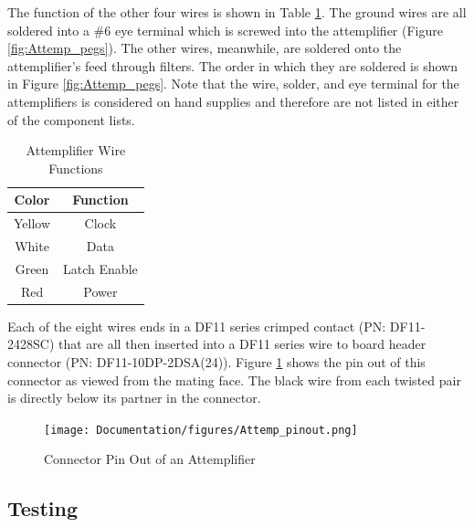 \documentclass[12pt,a4paper,oneside]{article}
\begin{document}
The function of the other four wires is shown in Table \ref{table: Wire_func}. The ground wires are all soldered into a \#6 eye terminal which is screwed into the attemplifier (Figure \ref{fig:Attemp_pegs}). The other wires, meanwhile, are  soldered onto the attemplifier's feed through filters. The order in which they are soldered is shown in Figure \ref{fig:Attemp_pegs}. Note that the wire, solder, and eye terminal for the attemplifiers is considered on hand supplies and therefore are not listed in either of the component lists. 

\begin{table}[H]
\centering
\caption{Attemplifier Wire Functions}
\begin{tabular}{@{}cc@{}}
\toprule
Color & Function\\ 
\midrule
Yellow & Clock\\
White & Data\\
Green & Latch Enable\\
Red & Power\\

\bottomrule            
\end{tabular}
\label{table: Wire_func}
\end{table}

Each of the eight wires ends in a DF11 series crimped contact (PN: DF11-2428SC) that are all then inserted into a DF11 series wire to board header connector (PN: DF11-10DP-2DSA(24)). Figure \ref{fig:pinout} shows the pin out of this connector as viewed from the mating face. The black wire from each twisted pair is directly below its partner in the connector.

%
\begin{figure}[H]
\centering
\texttt{[image: Documentation/figures/Attemp\_pinout.png]}
\caption{Connector Pin Out of an Attemplifier}
\label{fig:pinout}
\end{figure}
%

\subsection{Testing}
\label{sec:4.3}
\end{document}
